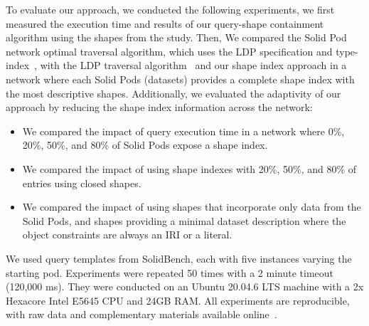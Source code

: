 To evaluate our approach, we conducted the following experiments, we first  measured the execution time and results of our query-shape containment algorithm using the shapes from the study.
Then, We compared the Solid Pod network optimal traversal algorithm, which uses the LDP specification and type-index~\cite{Taelman2023}, with the LDP traversal algorithm~\cite{Taelman2023} and our shape index approach in a network where each Solid Pods (datasets) provides a complete shape index with the most descriptive shapes.
Additionally, we evaluated the adaptivity of our approach by reducing the shape index information across the network:
\begin{itemize}
   \item We compared the impact of query execution time in a network where 0\%, 20\%, 50\%, and 80\% of Solid Pods expose a shape index.
   \item We compared the impact of using shape indexes with 20\%, 50\%, and 80\% of entries using closed shapes.
   \item We compared the impact of using shapes that incorporate only data from the Solid Pods, and shapes providing a minimal dataset description where the object constraints are always an IRI or a literal.
\end{itemize}
We used query templates from SolidBench, each with five instances varying the starting pod.
Experiments were repeated 50 times with a 2 minute timeout (120,000 ms). 
They were conducted on an Ubuntu 20.04.6 LTS machine with a 2x Hexacore Intel E5645 CPU and 24GB RAM.
All experiments are reproducible, with raw data and complementary materials available online~.


